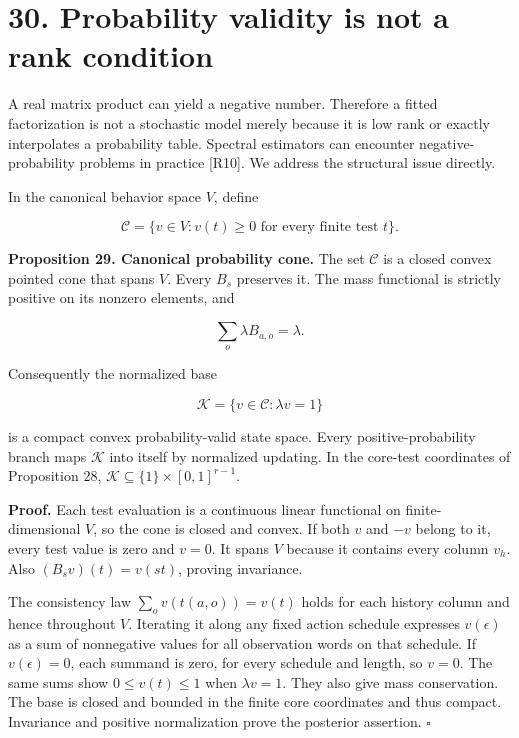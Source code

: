 \documentclass[11pt,letterpaper]{article}
\begin{document}
\section{30. Probability validity is not a rank
condition}\label{probability-validity-is-not-a-rank-condition}

A real matrix product can yield a negative number. Therefore a fitted
factorization is not a stochastic model merely because it is low rank or
exactly interpolates a probability table. Spectral estimators can
encounter negative-probability problems in practice {[}R10{]}. We
address the structural issue directly.

In the canonical behavior space \(V\), define

\[
\mathcal C=\{v\in V:v(t)\geq0\text{ for every finite test }t\}.
\]

\textbf{Proposition 29. Canonical probability cone.} The set
\(\mathcal C\) is a closed convex pointed cone that spans \(V\). Every
\(B_s\) preserves it. The mass functional is strictly positive on its
nonzero elements, and

\[
\sum_o\lambda B_{a,o}=\lambda.
\]

Consequently the normalized base

\[
\mathcal K=\{v\in\mathcal C:\lambda v=1\}
\]

is a compact convex probability-valid state space. Every
positive-probability branch maps \(\mathcal K\) into itself by
normalized updating. In the core-test coordinates of Proposition 28,
\(\mathcal K\subseteq\{1\}\times[0,1]^{r-1}\).

\textbf{Proof.} Each test evaluation is a continuous linear functional
on finite-dimensional \(V\), so the cone is closed and convex. If both
\(v\) and \(-v\) belong to it, every test value is zero and \(v=0\). It
spans \(V\) because it contains every column \(v_h\). Also
\((B_sv)(t)=v(st)\), proving invariance.

The consistency law \(\sum_ov(t(a,o))=v(t)\) holds for each history
column and hence throughout \(V\). Iterating it along any fixed action
schedule expresses \(v(\epsilon)\) as a sum of nonnegative values for
all observation words on that schedule. If \(v(\epsilon)=0\), each
summand is zero, for every schedule and length, so \(v=0\). The same
sums show \(0\leq v(t)\leq1\) when \(\lambda v=1\). They also give mass
conservation. The base is closed and bounded in the finite core
coordinates and thus compact. Invariance and positive normalization
prove the posterior assertion. \(\square\)
\end{document}

